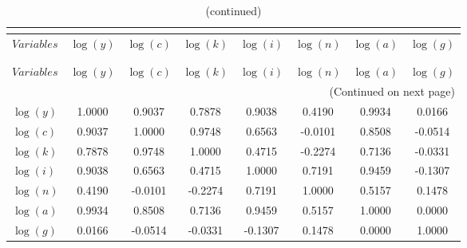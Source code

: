  
\begin{center}
\begin{longtable}{lccccccc} 
\caption{MATRIX OF CORRELATIONS}\\
 \label{Table:th_corr_matrix}\\
\toprule 
$Variables  $	 & 	 $   \log(y)$	 & 	 $   \log(c)$	 & 	 $   \log(k)$	 & 	 $   \log(i)$	 & 	 $   \log(n)$	 & 	 $   \log(a)$	 & 	 $   \log(g)$\\
\midrule \endfirsthead 
\caption{(continued)}\\
 \toprule \\ 
$Variables  $	 & 	 $   \log(y)$	 & 	 $   \log(c)$	 & 	 $   \log(k)$	 & 	 $   \log(i)$	 & 	 $   \log(n)$	 & 	 $   \log(a)$	 & 	 $   \log(g)$\\
\midrule \endhead 
\midrule \multicolumn{8}{r}{(Continued on next page)} \\ \bottomrule \endfoot 
\bottomrule \endlastfoot 
$\log(y)    $	 & 	     1.0000	 & 	     0.9037	 & 	     0.7878	 & 	     0.9038	 & 	     0.4190	 & 	     0.9934	 & 	     0.0166 \\ 
$\log(c)    $	 & 	     0.9037	 & 	     1.0000	 & 	     0.9748	 & 	     0.6563	 & 	    -0.0101	 & 	     0.8508	 & 	    -0.0514 \\ 
$\log(k)    $	 & 	     0.7878	 & 	     0.9748	 & 	     1.0000	 & 	     0.4715	 & 	    -0.2274	 & 	     0.7136	 & 	    -0.0331 \\ 
$\log(i)    $	 & 	     0.9038	 & 	     0.6563	 & 	     0.4715	 & 	     1.0000	 & 	     0.7191	 & 	     0.9459	 & 	    -0.1307 \\ 
$\log(n)    $	 & 	     0.4190	 & 	    -0.0101	 & 	    -0.2274	 & 	     0.7191	 & 	     1.0000	 & 	     0.5157	 & 	     0.1478 \\ 
$\log(a)    $	 & 	     0.9934	 & 	     0.8508	 & 	     0.7136	 & 	     0.9459	 & 	     0.5157	 & 	     1.0000	 & 	     0.0000 \\ 
$\log(g)    $	 & 	     0.0166	 & 	    -0.0514	 & 	    -0.0331	 & 	    -0.1307	 & 	     0.1478	 & 	     0.0000	 & 	     1.0000 \\ 
\end{longtable}
 \end{center}

